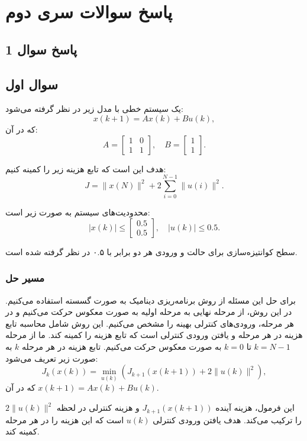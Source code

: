 
\chapter{پاسخ سوالات سری دوم}

\section{ پاسخ سوال 1}
\section{سوال اول}


یک سیستم خطی با مدل زیر در نظر گرفته می‌شود:  
\[
x(k+1) = A x(k) + B u(k),
\]
که در آن:
\[
A = \begin{bmatrix} 1 & 0 \\ 1 & 1 \end{bmatrix}, \quad B = \begin{bmatrix} 1 \\ 1 \end{bmatrix}.
\]

هدف این است که تابع هزینه زیر را کمینه کنیم:
\[
J = \|x(N)\|^2 + 2 \sum_{i=0}^{N-1} \|u(i)\|^2.
\]

محدودیت‌های سیستم به صورت زیر است:
\[
|x(k)| \leq \begin{bmatrix} 0.5 \\ 0.5 \end{bmatrix}, \quad |u(k)| \leq 0.5.
\]

سطح کوانتیزه‌سازی برای حالت و ورودی هر دو برابر با ۰.۵ در نظر گرفته شده است.

\subsection*{مسیر حل}
برای حل این مسئله از روش برنامه‌ریزی دینامیک به صورت گسسته استفاده می‌کنیم. در این روش، از مرحله نهایی به مرحله اولیه به صورت معکوس حرکت می‌کنیم و در هر مرحله، ورودی‌های کنترلی بهینه را مشخص می‌کنیم. این روش شامل محاسبه تابع هزینه در هر مرحله و یافتن ورودی کنترلی است که تابع هزینه را کمینه کند.  
ما از مرحله \( k = N-1 \) تا \( k = 0 \) به صورت معکوس حرکت می‌کنیم. تابع هزینه در هر مرحله \( k \) به صورت زیر تعریف می‌شود:
\[
J_k(x(k)) = \min_{u(k)} \left( J_{k+1}(x(k+1)) + 2\|u(k)\|^2 \right),
\]
که در آن \( x(k+1) = A x(k) + B u(k) \).

این فرمول، هزینه آینده \( J_{k+1}(x(k+1)) \) و هزینه کنترلی در لحظه \( 2\|u(k)\|^2 \) را ترکیب می‌کند. هدف یافتن ورودی کنترلی \( u(k) \) است که این هزینه را در هر مرحله کمینه کند.

